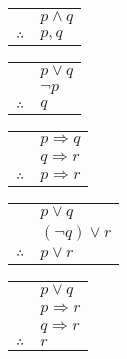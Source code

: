\documentclass[main.tex]{subfiles}
\begin{document}
\begin{thm}
	\mbox{}
	\begin{center}
		\begin{tabular}{c@{\,}l@{}}
			& \(p \land q\) \\
			\cline{2-2}
			\(\therefore\) & \(p,q\)
		\end{tabular}
	\end{center}
\end{thm}

\begin{thm}
	\mbox{}
	\begin{center}
		\begin{tabular}{c@{\,}l@{}}
			& \(p \lor q\) \\
			& \(\lnot p\) \\
			\cline{2-2}
			\(\therefore\) & \(q\)
		\end{tabular}
	\end{center}
\end{thm}

\begin{thm}
	\mbox{}
	\begin{center}
		\begin{tabular}{c@{\,}l@{}}
			& \(p \Rightarrow q\) \\
			& \(q \Rightarrow r\) \\
			\cline{2-2}
			\(\therefore\) & \(p \Rightarrow r\)
		\end{tabular}
	\end{center}
\end{thm}

\begin{thm}[Resolution]
	\mbox{}
	\begin{center}
		\begin{tabular}{c@{\,}l@{}}
			& \(p \lor q\) \\
			& \((\lnot q) \lor r\) \\
			\cline{2-2}
			\(\therefore\) & \(p \lor r\)
		\end{tabular}
	\end{center}
\end{thm}

\begin{thm}
	\mbox{}
	\begin{center}
		\begin{tabular}{c@{\,}l@{}}
			& \(p \lor q\) \\
			& \(p \Rightarrow r\) \\
			& \(q \Rightarrow r\) \\
			\cline{2-2}
			\(\therefore\) & \(r\)
		\end{tabular}
	\end{center}
\end{thm}
\end{document}
